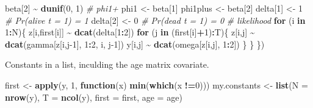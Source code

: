 \documentclass[
  12pt,
]{krantz}
\newenvironment{Shaded}{\begin{snugshade}}{\end{snugshade}}
\newcommand{\AttributeTok}[1]{\textcolor[rgb]{0.13,0.29,0.53}{#1}}
\newcommand{\CommentTok}[1]{\textcolor[rgb]{0.56,0.35,0.01}{\textit{#1}}}
\newcommand{\ControlFlowTok}[1]{\textcolor[rgb]{0.13,0.29,0.53}{\textbf{#1}}}
\newcommand{\DecValTok}[1]{\textcolor[rgb]{0.00,0.00,0.81}{#1}}
\newcommand{\FunctionTok}[1]{\textcolor[rgb]{0.13,0.29,0.53}{\textbf{#1}}}
\newcommand{\NormalTok}[1]{#1}
\newcommand{\OtherTok}[1]{\textcolor[rgb]{0.56,0.35,0.01}{#1}}
\newcommand{\SpecialCharTok}[1]{\textcolor[rgb]{0.81,0.36,0.00}{\textbf{#1}}}
\begin{document}
\begin{Shaded}
\begin{Highlighting}[]
\NormalTok{  beta[}\DecValTok{2}\NormalTok{] }\SpecialCharTok{\textasciitilde{}} \FunctionTok{dunif}\NormalTok{(}\DecValTok{0}\NormalTok{, }\DecValTok{1}\NormalTok{) }\CommentTok{\# phi1+}
\NormalTok{  phi1 }\OtherTok{\textless{}{-}}\NormalTok{ beta[}\DecValTok{1}\NormalTok{]}
\NormalTok{  phi1plus }\OtherTok{\textless{}{-}}\NormalTok{ beta[}\DecValTok{2}\NormalTok{]}
\NormalTok{  delta[}\DecValTok{1}\NormalTok{] }\OtherTok{\textless{}{-}} \DecValTok{1}          \CommentTok{\# Pr(alive t = 1) = 1}
\NormalTok{  delta[}\DecValTok{2}\NormalTok{] }\OtherTok{\textless{}{-}} \DecValTok{0}          \CommentTok{\# Pr(dead t = 1) = 0}
  \CommentTok{\# likelihood}
  \ControlFlowTok{for}\NormalTok{ (i }\ControlFlowTok{in} \DecValTok{1}\SpecialCharTok{:}\NormalTok{N)\{}
\NormalTok{    z[i,first[i]] }\SpecialCharTok{\textasciitilde{}} \FunctionTok{dcat}\NormalTok{(delta[}\DecValTok{1}\SpecialCharTok{:}\DecValTok{2}\NormalTok{])}
    \ControlFlowTok{for}\NormalTok{ (j }\ControlFlowTok{in}\NormalTok{ (first[i]}\SpecialCharTok{+}\DecValTok{1}\NormalTok{)}\SpecialCharTok{:}\NormalTok{T)\{}
\NormalTok{      z[i,j] }\SpecialCharTok{\textasciitilde{}} \FunctionTok{dcat}\NormalTok{(gamma[z[i,j}\DecValTok{{-}1}\NormalTok{], }\DecValTok{1}\SpecialCharTok{:}\DecValTok{2}\NormalTok{, i, j}\DecValTok{{-}1}\NormalTok{])}
\NormalTok{      y[i,j] }\SpecialCharTok{\textasciitilde{}} \FunctionTok{dcat}\NormalTok{(omega[z[i,j], }\DecValTok{1}\SpecialCharTok{:}\DecValTok{2}\NormalTok{])}
\NormalTok{    \}}
\NormalTok{  \}}
\NormalTok{\})}
\end{Highlighting}
\end{Shaded}

Constants in a list, inculding the age matrix covariate.

\begin{Shaded}
\begin{Highlighting}[]
\NormalTok{first }\OtherTok{\textless{}{-}} \FunctionTok{apply}\NormalTok{(y, }\DecValTok{1}\NormalTok{, }\ControlFlowTok{function}\NormalTok{(x) }\FunctionTok{min}\NormalTok{(}\FunctionTok{which}\NormalTok{(x }\SpecialCharTok{!=}\DecValTok{0}\NormalTok{)))}
\NormalTok{my.constants }\OtherTok{\textless{}{-}} \FunctionTok{list}\NormalTok{(}\AttributeTok{N =} \FunctionTok{nrow}\NormalTok{(y), }
                     \AttributeTok{T =} \FunctionTok{ncol}\NormalTok{(y), }
                     \AttributeTok{first =}\NormalTok{ first,}
                     \AttributeTok{age =}\NormalTok{ age)}
\end{Highlighting}
\end{Shaded}
\end{document}
